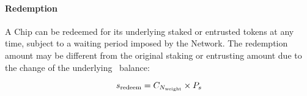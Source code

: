 \paragraph{Redemption}
A Chip can be redeemed for its underlying staked or entrusted tokens at any time, subject to a waiting period imposed by the Network.
The redemption amount may be different from the original staking or entrusting amount due to the change of the underlying \stakingPool\ balance:

\begin{equation}
    \label{eq:chip_redeem}
    s_\text{redeem} = C_{N_\text{weight}} \times P_{s}
\end{equation}








